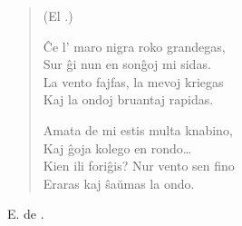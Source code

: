 \begin{verse}
\begin{center}
\footnotesize (El .)
\end{center}
                  \^Ce l' maro nigra roko grandegas,\\
                  Sur \^gi nun en son\^goj mi sidas.\\
                  La vento fajfas, la mevoj kriegas\\
                  Kaj la ondoj bruantaj rapidas.

                  Amata de mi estis multa knabino,\\
                  Kaj \^goja kolego en rondo\dots\\
                  Kien ili fori\^gis? Nur vento sen fino\\
                  Eraras kaj \^sa\u umas la ondo.

\end{verse}
\begin{flushright}
\footnotesize E. de .
\end{flushright}

\smallrule{}